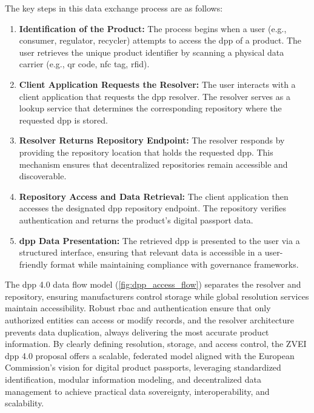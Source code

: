 The key steps in this data exchange process are as follows:

\begin{enumerate}[itemsep=0.5\baselineskip]
    \item \textbf{Identification of the Product:} The process begins when a user (e.g., consumer, regulator, recycler) attempts to access the \ac{dpp} of a product. The user retrieves the unique product identifier by scanning a physical data carrier (e.g., \ac{qr} code, \ac{nfc} tag, \ac{rfid}).
    \item \textbf{Client Application Requests the Resolver:} The user interacts with a client application that requests the \ac{dpp} resolver. The resolver serves as a lookup service that determines the corresponding repository where the requested \ac{dpp} is stored.
    \item \textbf{Resolver Returns Repository Endpoint:} The resolver responds by providing the repository location that holds the requested \ac{dpp}. This mechanism ensures that decentralized repositories remain accessible and discoverable.
    \item \textbf{Repository Access and Data Retrieval:} The client application then accesses the designated \ac{dpp} repository endpoint. The repository verifies authentication and returns the product’s digital passport data.
    \item \textbf{\ac{dpp} Data Presentation:} The retrieved \ac{dpp} is presented to the user via a structured interface, ensuring that relevant data is accessible in a user-friendly format while maintaining compliance with governance frameworks.
\end{enumerate}

The \ac{dpp} 4.0 data flow model (\cref{fig:dpp_access_flow}) separates the resolver and repository, ensuring manufacturers control storage while global resolution services maintain accessibility. Robust \acrlong{rbac} and authentication ensure that only authorized entities can access or modify records, and the resolver architecture prevents data duplication, always delivering the most accurate product information. By clearly defining resolution, storage, and access control, the ZVEI \ac{dpp} 4.0 proposal offers a scalable, federated model aligned with the European Commission’s vision for digital product passports, leveraging standardized identification, modular information modeling, and decentralized data management to achieve practical data sovereignty, interoperability, and scalability. \autocite{Garrels.2023}


